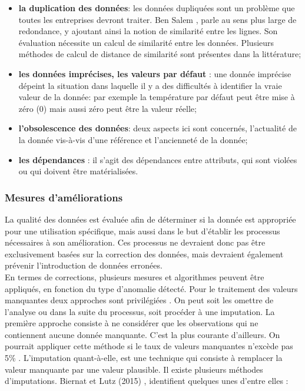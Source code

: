 \begin{itemize}[parsep=0cm,itemsep=0cm]
\item \textbf{la duplication des donn\'ees}: les données dupliquées sont un problème que toutes les entreprises devront traiter. Ben Salem \cite{bensalem}, parle au sens plus large de redondance, y ajoutant ainsi la notion de similarit\'e entre les lignes. Son évaluation n\'ecessite un calcul de similarit\'e entre les donn\'ees. Plusieurs m\'ethodes de calcul de distance de similarit\'e sont pr\'esentes dans la litt\'erature;

\item \textbf{les donn\'ees impr\'ecises, les valeurs par d\'efaut} : une donn\'ee impr\'ecise d\'epeint la situation dans laquelle il y a des difficult\'es \`a identifier la vraie valeur de la donn\'ee: par exemple la temp\'erature par d\'efaut peut \^etre mise \`a z\'ero (0) mais aussi z\'ero peut \^etre la valeur r\'eelle;

\item \textbf{l'obsolescence des donn\'ees}: deux aspects ici sont concern\'es, l'actualit\'e de la donn\'ee vis-\`a-vis d'une r\'ef\'erence et l'anciennet\'e de la donn\'ee;

\item \textbf{les d\'ependances} :  il s'agit  des d\'ependances entre attributs, qui sont viol\'ees ou qui doivent \^etre mat\'erialis\'ees. 
\end{itemize}

\subsubsection{\textbf{Mesures d'am\'eliorations}} 
La qualité des données est évaluée afin de d\'eterminer si la donnée est appropriée pour une utilisation spécifique, mais aussi dans le but d'établir les processus nécessaires à son amélioration. Ces processus ne devraient donc pas être exclusivement basées sur la correction des données, mais devraient également pr\'evenir l'introduction de donn\'ees erron\'ees. 
\\

En termes de corrections, plusieurs mesures et algorithmes peuvent \^etre appliqu\'es, en fonction du type d'anomalie d\'etect\'e. Pour le traitement des valeurs manquantes deux approches sont privil\'egi\'ees \cite{glassoncicognani}. On peut soit les omettre de l'analyse ou dans la suite du processus, soit proc\'eder \`a une imputation. La premi\`ere approche consiste \`a ne consid\'erer que  les observations qui ne contiennent aucune donn\'ee manquante. C'est la plus courante d'ailleurs. On pourrait appliquer cette m\'ethode si le taux de valeurs manquantes n'exc\`ede pas 5\% \cite{datascience}. L'imputation quant-\`a-elle, est une technique qui consiste \`a remplacer la valeur manquante par une valeur plausible. Il existe plusieurs m\'ethodes d'imputations. Biernat et Lutz (2015) \cite{datascience}, identifient quelques unes d'entre elles :

